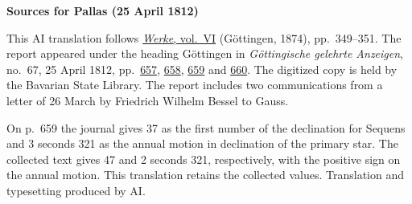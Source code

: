 \clearpage\thispagestyle{empty}
\begin{center}\textbf{Sources for Pallas (25 April 1812)}\end{center}
\noindent This AI translation follows \href{https://gdz.sub.uni-goettingen.de/id/PPN236007467}{\textit{Werke}, vol.~VI} (Göttingen, 1874), pp.~349--351. The report appeared under the heading Göttingen in \textit{Göttingische gelehrte Anzeigen}, no.~67, 25 April 1812, pp.~\href{https://api.digitale-sammlungen.de/iiif/image/v2/bsb10538681_00701/full/1600,/0/default.jpg}{657}, \href{https://api.digitale-sammlungen.de/iiif/image/v2/bsb10538681_00702/full/1600,/0/default.jpg}{658}, \href{https://api.digitale-sammlungen.de/iiif/image/v2/bsb10538681_00703/full/1600,/0/default.jpg}{659} and \href{https://api.digitale-sammlungen.de/iiif/image/v2/bsb10538681_00704/full/1600,/0/default.jpg}{660}. The digitized copy is held by the Bavarian State Library. The report includes two communications from a letter of 26 March by Friedrich Wilhelm Bessel to Gauss.
\par\smallskip\noindent On p.~659 the journal gives 37 as the first number of the declination for Sequens and 3 seconds 321 as the annual motion in declination of the primary star. The collected text gives 47 and 2 seconds 321, respectively, with the positive sign on the annual motion. This translation retains the collected values. Translation and typesetting produced by AI.
\clearpage
